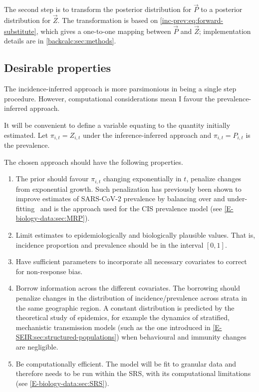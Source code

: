 \documentclass[thesis.tex]{subfiles}
\begin{document}
The second step is to transform the posterior distribution for $\vec{P}$ to a posterior distribution for $\vec{Z}$.
The transformation is based on \cref{inc-prev:eq:forward-substitute}, which gives a one-to-one mapping between $\vec{P}$ and $\vec{Z}$; implementation details are in \cref{backcalc:sec:methods}.

\subsection{Desirable properties} \label{transmission:sec:backcalc-properties}

The incidence-inferred approach is more parsimonious in being a single step procedure.
However, computational considerations mean I favour the prevalence-inferred approach.

It will be convenient to define a variable equating to the quantity initially estimated.
Let $\pi_{i,t} = Z_{i,t}$ under the inference-inferred approach and $\pi_{i,t} = P_{i,t}$ is the prevalence.

The chosen approach should have the following properties.
\begin{enumerate}
    \item The prior should favour $\pi_{i,t}$ changing exponentially in $t$, \ie penalize changes from exponential growth.
        Such penalization has previously been shown to improve estimates of SARS-CoV-2 prevalence by balancing over and under-fitting~\autocite{ealesAppropriately} and is the approach used for the CIS prevalence model (see \cref{E-biology-data:sec:MRP}).
    \item Limit estimates to epidemiologically and biologically plausible values.
        That is, incidence proportion and prevalence should be in the interval $[0, 1]$.
    \item Have sufficient parameters to incorporate all necessary covariates to correct for non-response bias.
    \item Borrow information across the different covariates.
        The borrowing should penalize changes in the distribution of incidence/prevalence across strata in the same geographic region.
        A constant distribution is predicted by the theoretical study of epidemics, for example the dynamics of stratified, mechanistic transmission models (such as the one introduced in \cref{E-SEIR:sec:structured-populations}) when behavioural and immunity changes are negligible.
    \item Be computationally efficient.
        The model will be fit to granular data and therefore needs to be run within the SRS, with its computational limitations (see \cref{E-biology-data:sec:SRS}).
\end{enumerate}
\end{document}
